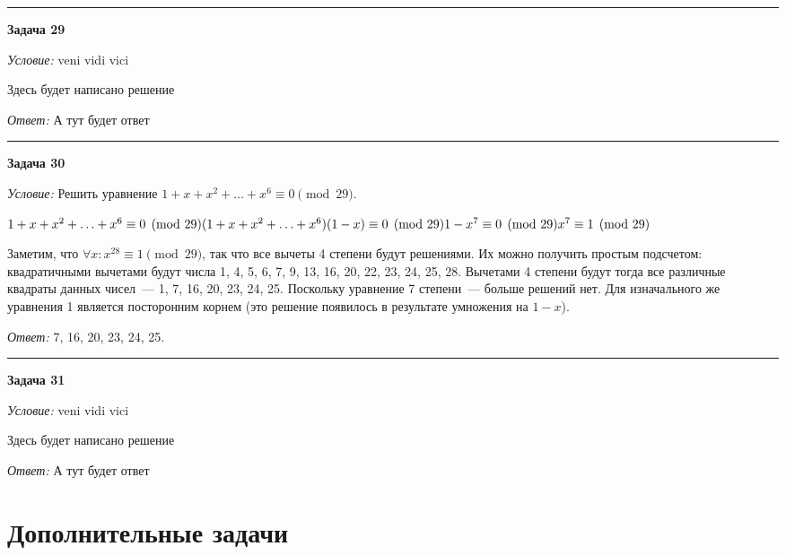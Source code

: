 \documentclass[12pt,a4paper]{article}
\newcommand{\sbs}{\large \bfseries}
\newcommand{\rl}{\vspace{16pt} \hrule \vspace{8pt}}
\begin{document}
\rl
{\sbs Задача 29}

{\itshape Условие: } veni vidi vici

Здесь будет написано решение

{\itshape Ответ: } А тут будет ответ




\rl
{\sbs Задача 30}

{\itshape Условие: } Решить уравнение $1+x+x^2+\ldots+x^6\equiv 0\pmod{29}$.

$1+x+x^2+\ldots+x^6\equiv 0\pmod{29}\\
(1+x+x^2+\ldots+x^6)(1-x)\equiv 0\pmod{29}\\
1-x^7\equiv 0\pmod{29}\\
x^7\equiv 1\pmod{29}$

Заметим, что $\forall x: x^{28}\equiv 1\pmod{29}$, так что все вычеты 4 степени будут решениями. Их можно получить простым подсчетом: квадратичными вычетами будут числа 1, 4, 5, 6, 7, 9, 13, 16, 20, 22, 23, 24, 25, 28. Вычетами 4 степени будут тогда все различные квадраты данных чисел~--- 1, 7, 16, 20, 23, 24, 25. Поскольку уравнение 7 степени~--- больше решений нет. Для изначального же уравнения 1 является посторонним корнем (это решение появилось в результате умножения на $1-x$).

{\itshape Ответ:} 7, 16, 20, 23, 24, 25.





\rl
{\sbs Задача 31}

{\itshape Условие: } veni vidi vici

Здесь будет написано решение

{\itshape Ответ: } А тут будет ответ

































\newpage
\part*{Дополнительные задачи}
\end{document}
